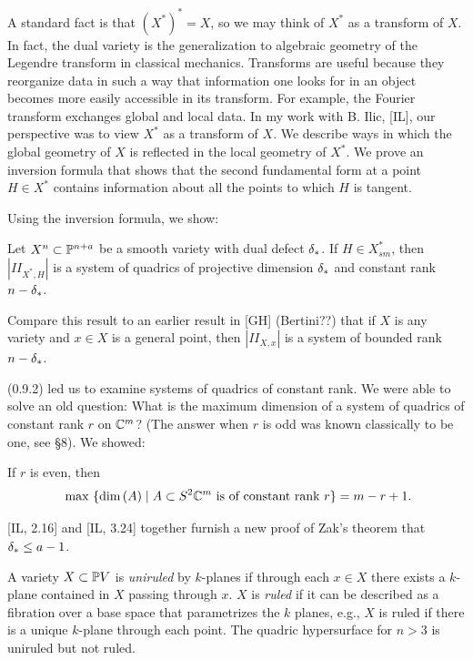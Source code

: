 A standard fact is that $(X^*)^*=X$, so we may think of $X^*$ as
a transform of $X$. In fact, the dual variety is the generalization
to algebraic geometry of the Legendre transform in classical mechanics.
Transforms are useful because they reorganize data 
in such a way  that information one   looks for
in an object  becomes more easily accessible
in its transform. For example,
 the   Fourier transform
exchanges global and local data. 
In my work with B. Ilic, [IL], our perspective was to view
$X^*$ as a transform of $X$. We describe ways in which the global
geometry of $X$ is reflected in the local geometry of $X^*$. 
We prove an inversion formula
that shows  that the second fundamental form at a point  
$H\in X^*$ contains information about all the points to which $H$ is
tangent.



Using the inversion formula, we show:


Let $X^n\subset\Bbb P^{n+a}$ be a smooth variety
with dual defect $\delta_{*}$.
 If $H\in 
X^*_{sm}$, then $|II_{X^*,H}|$ is a system of quadrics of
projective dimension $\delta_{*}$ and constant rank $n-\delta_{*}$.
\endproclaim

Compare this result to an earlier result in [GH] (Bertini??)   that
if $X$ is any variety and $x\in X$ is a general point, then
$|II_{X,x}|$ is a system of bounded rank $n-\delta_{*}$.

(0.9.2) led us to examine systems of quadrics of constant rank.
We were able
to solve an old question: What is the maximum dimension
of a system of quadrics of constant rank $r$ on $\Bbb C^{m}$?  
(The answer when $r$ is odd was known classically to be one, see
\S 8). We showed:

 If $r$ is even,   then
$$\text{ max } \{ \text{dim}\,(A) \mid A \subset S^2\Bbb C^{m} \text{ is of constant rank } r
\}
 = m-r+1.$$
\endproclaim

[IL, 2.16] and [IL, 3.24] together furnish a new proof
of Zak's theorem
that  $\delta_{*}\leq a-1$.  

\bigpagebreak




 A variety 
$X\subset\Bbb P V$
is {\it uniruled} 
by $k$-planes if through
each
$x\in X$ there exists a $k$-plane contained in $X$ passing through $x$.
$X$ is {\it ruled} if it can be described as a fibration over
a base space that parametrizes the $k$ planes, e.g., 
$X$ is ruled if there is a unique   $k$-plane
through each point. The quadric hypersurface for $n>3$ is uniruled but not
ruled.


